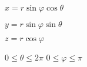 \documentclass[UTF8]{ctexart}
\begin{document}
$x=r\sin\varphi\cos\theta$

$y=r\sin\varphi\sin\theta$

$z=r\cos\varphi$

$0\leq\theta\leq2\pi$ $0\leq\varphi\leq\pi$
\end{document}
